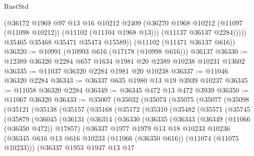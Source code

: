 \begin{lexlean}{RustStd}
\begin{coremodule}
              (@36172
                @1969
                @97
                @13
                @16
                @10212
                @2409
                (@36270 @1968 @10212 (@11097 (@11098 @10212)) (@11102 (@11104 @1968 @13)))
                (@11137 @36137 @2284)))))
        @35465
        @35468
        @35471
        @35474
        @15589))
    (@11102 (@11471 @36137 @616))
@36320 := @10991 (@10993 @616 (@17178 (@10998 @616))) @36137
@36330 := @12389 @36320 @2284 @657 @1634 @1981 @20 @2389 @10238 @10231 @13602
@36335 := @11037 @36320 @2284 @1981 @20 @10238
@36337 := @11046 @36320 @2284
@36343 := @36337 @635 @1980 @13 @19 @3939 @10237
@36345 := @11058 @36320 @2284
@36349 := @36345 @472 @13 @472 @3939
@36350 := @11067 @36320
@36433 := @35007
    (@35032
      (@35073
        (@35075
          (@35077
            (@35098
              (@35121
                (@35138
                  (@35157
                    (@35168
                      (@35172
                        (@35310
                          (@35482
                            (@35571
                              (@35745
                                (@35879
                                  (@36045
                                    (@36131
                                      (@36314
                                        (@36330
                                          (@36335
                                            (@36343
                                              (@36349 (@11066 (@36350 @472)) @17857)
                                              (@36337
                                                @1977
                                                @1979
                                                @13
                                                @18
                                                @10233
                                                @10236
                                                (@36345
                                                  @616
                                                  @13
                                                  @616
                                                  @10233
                                                  (@11066 (@36350 @616))
                                                  (@11074 (@11075 @10233)))
                                                (@36337
                                                  @1953
                                                  @1947
                                                  @13
                                                  @17

\end{coremodule}
\end{lexlean}
